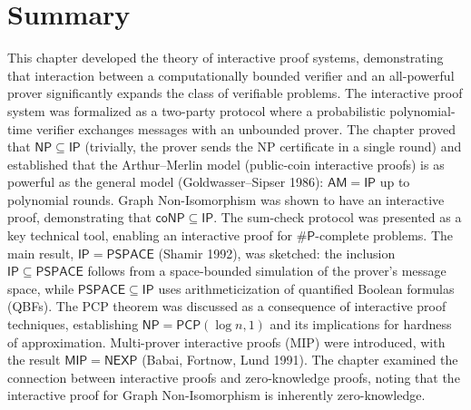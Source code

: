 \section{Summary}
\label{sec:ip:summary}

This chapter developed the theory of interactive proof systems, demonstrating that interaction between a computationally bounded verifier and an all-powerful prover significantly expands the class of verifiable problems. The interactive proof system was formalized as a two-party protocol where a probabilistic polynomial-time verifier exchanges messages with an unbounded prover. The chapter proved that $\mathsf{NP} \subseteq \mathsf{IP}$ (trivially, the prover sends the NP certificate in a single round) and established that the Arthur--Merlin model (public-coin interactive proofs) is as powerful as the general model (Goldwasser--Sipser 1986): $\mathsf{AM} = \mathsf{IP}$ up to polynomial rounds. Graph Non-Isomorphism was shown to have an interactive proof, demonstrating that $\mathsf{coNP} \subseteq \mathsf{IP}$. The sum-check protocol was presented as a key technical tool, enabling an interactive proof for $\#\mathsf{P}$-complete problems. The main result, $\mathsf{IP} = \mathsf{PSPACE}$ (Shamir 1992), was sketched: the inclusion $\mathsf{IP} \subseteq \mathsf{PSPACE}$ follows from a space-bounded simulation of the prover's message space, while $\mathsf{PSPACE} \subseteq \mathsf{IP}$ uses arithmeticization of quantified Boolean formulas (QBFs). The PCP theorem was discussed as a consequence of interactive proof techniques, establishing $\mathsf{NP} = \mathsf{PCP}(\log n, 1)$ and its implications for hardness of approximation. Multi-prover interactive proofs (MIP) were introduced, with the result $\mathsf{MIP} = \mathsf{NEXP}$ (Babai, Fortnow, Lund 1991). The chapter examined the connection between interactive proofs and zero-knowledge proofs, noting that the interactive proof for Graph Non-Isomorphism is inherently zero-knowledge.

